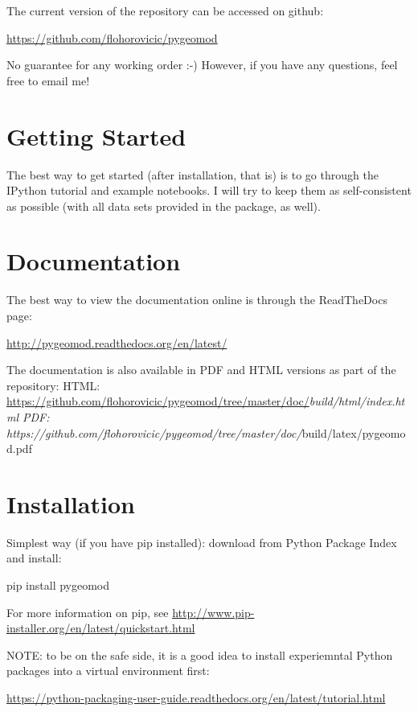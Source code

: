 \documentclass[letterpaper,10pt,english]{sphinxmanual}
\begin{document}
The current version of the repository can be accessed on github:

\href{https://github.com/flohorovicic/pygeomod}{https://github.com/flohorovicic/pygeomod}

No guarantee for any working order :-) However, if you have any
questions, feel free to email me!


\section{Getting Started}
\label{readme:getting-started}
The best way to get started (after installation, that is) is to go
through the IPython tutorial and example notebooks. I will try to keep
them as self-consistent as possible (with all data sets provided in the
package, as well).


\section{Documentation}
\label{readme:documentation}
The best way to view the documentation online is through the ReadTheDocs
page:

\href{http://pygeomod.readthedocs.org/en/latest/}{http://pygeomod.readthedocs.org/en/latest/}

The documentation is also available in PDF and HTML versions as part of
the repository: HTML:
\href{https://github.com/flohorovicic/pygeomod/tree/master/doc/}{https://github.com/flohorovicic/pygeomod/tree/master/doc/}\emph{build/html/index.html
PDF:
https://github.com/flohorovicic/pygeomod/tree/master/doc/}build/latex/pygeomod.pdf


\section{Installation}
\label{readme:installation}
Simplest way (if you have pip installed): download from Python Package
Index and install:

pip install pygeomod

For more information on pip, see
\href{http://www.pip-installer.org/en/latest/quickstart.html}{http://www.pip-installer.org/en/latest/quickstart.html}

NOTE: to be on the safe side, it is a good idea to install experiemntal
Python packages into a virtual environment first:

\href{https://python-packaging-user-guide.readthedocs.org/en/latest/tutorial.html}{https://python-packaging-user-guide.readthedocs.org/en/latest/tutorial.html}
\end{document}
